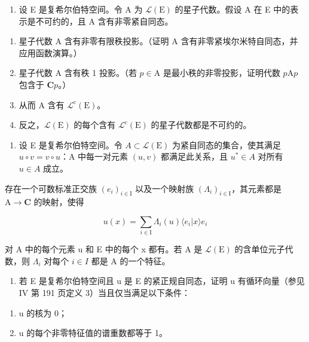 \begin{enumerate}
\def\labelenumi{\arabic{enumi})}
\setcounter{enumi}{9}
\tightlist
\item
  设 E 是复希尔伯特空间。令 A 为 \(\mathcal{L}(\mathrm{E})\) 的星子代数。假设 A 在 E 中的表示是不可约的，且 A 含有非零紧自同态。
\end{enumerate}

\begin{enumerate}
\def\labelenumi{\alph{enumi})}
\item
  星子代数 A 含有非零有限秩投影。（证明 A 含有非零紧埃尔米特自同态，并应用函数演算。）
\item
  星子代数 A 含有秩 1 投影。（若 \(p \in \mathrm{A}\) 是最小秩的非零投影，证明代数 \(p\mathrm{A}p\) 包含于 \(\mathbf{C}p\)。）
\item
  从而 A 含有 \(\mathcal{L}^{\mathrm{c}}(\mathrm{E})\)。
\item
  反之，\(\mathcal{L}(\mathrm{E})\) 的每个含有 \(\mathcal{L}^{\mathrm{c}}(\mathrm{E})\) 的星子代数都是不可约的。
\end{enumerate}

\begin{enumerate}
\def\labelenumi{\arabic{enumi})}
\setcounter{enumi}{10}
\tightlist
\item
  设 E 是复希尔伯特空间。令 \(A \subset \mathcal{L}(\mathrm{E})\) 为紧自同态的集合，使其满足 \(u \circ v = v \circ u\)：A 中每一对元素 \((u, v)\) 都满足此关系，且 \(u^{*} \in A\) 对所有 \(u \in A\) 成立。
\end{enumerate}

存在一个可数标准正交族 \((e_i)_{i\in \mathrm{I}}\) 以及一个映射族 \((\Lambda_i)_{i\in \mathrm{I}}\)，其元素都是 \(\mathrm{A}\to \mathbf{C}\) 的映射，使得

\[
u (x) = \sum_ {i \in \mathrm{I}} \Lambda_ {i} (u) \langle e _ {i} | x \rangle e _ {i}
\]

对 A 中的每个元素 u 和 E 中的每个 x 都有。若 A 是 \(\mathcal{L}(\mathrm{E})\) 的含单位元子代数，则 \(\Lambda_{i}\) 对每个 \(i \in I\) 都是 A 的一个特征。

\begin{enumerate}
\def\labelenumi{\arabic{enumi})}
\setcounter{enumi}{11}
\tightlist
\item
  若 E 是复希尔伯特空间且 u 是 E 的紧正规自同态，证明 u 有循环向量（参见 IV 第 191 页定义 3）当且仅当满足以下条件：
\end{enumerate}

\begin{enumerate}
\def\labelenumi{(\roman{enumi})}
\item
  u 的核为 0；
\item
  u 的每个非零特征值的谱重数都等于 1。
\end{enumerate}

